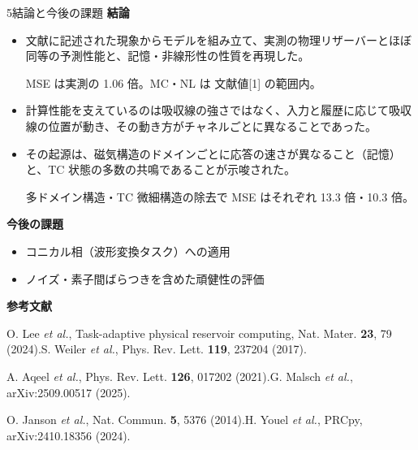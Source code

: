 \documentclass{article}
\newcommand\rTC{10.3}     %
\newcommand\rMD{13.3}     %
\newcommand\gapfull{1.06}   %
\newcommand\smallfont{\fontsize{19.5}{25}\selectfont}
\newcommand\emk[1]{\textbf{#1}}
\newlength\gap   \setlength\gap{4mm}
\newlength\halfw \setlength\halfw{\dimexpr(\textwidth-\gap)/2\relax}
\begin{document}
\begin{minipage}[t]{\halfw}
\begin{secbox}{5\enspace 結論と今後の課題}
\emk{結論}
\begin{itemize}
  \item 文献に記述された現象からモデルを組み立て、実測の物理リザーバーとほぼ同等の予測性能と、記憶・非線形性の性質を再現した。{\smallfont\color{cGray} MSE は実測の \gapfull{} 倍。MC・NL は 文献値[1] の範囲内。\par}
  \item 計算性能を支えているのは吸収線の強さではなく、入力と履歴に応じて吸収線の位置が動き、その動き方がチャネルごとに異なることであった。\par
  \item その起源は、磁気構造のドメインごとに応答の速さが異なること（記憶）と、TC 状態の多数の共鳴であることが示唆された。{\smallfont\color{cGray} 多ドメイン構造・TC 微細構造の除去で MSE はそれぞれ \rMD{} 倍・\rTC{} 倍。\par}
  \end{itemize}
\vspace{3mm}
\emk{今後の課題}
\begin{itemize}
  \item コニカル相（波形変換タスク）への適用
  \item ノイズ・素子間ばらつきを含めた頑健性の評価
\end{itemize}


\end{secbox}

\vspace{5mm}
{\fontsize{18}{22}\selectfont\color{black!85}
\textbf{参考文献}\par
[1] O. Lee \textit{et al.}, Task-adaptive physical reservoir computing, Nat. Mater. \textbf{23}, 79 (2024).\qquad
[2] S. Weiler \textit{et al.}, Phys. Rev. Lett. \textbf{119}, 237204 (2017).\par
[3] A. Aqeel \textit{et al.}, Phys. Rev. Lett. \textbf{126}, 017202 (2021).\qquad
[4] G. Malsch \textit{et al.}, arXiv:2509.00517 (2025).\par
[5] O. Janson \textit{et al.}, Nat. Commun. \textbf{5}, 5376 (2014).\qquad
[6] H. Youel \textit{et al.}, PRCpy, arXiv:2410.18356 (2024).\par}
\end{minipage}
\end{document}
